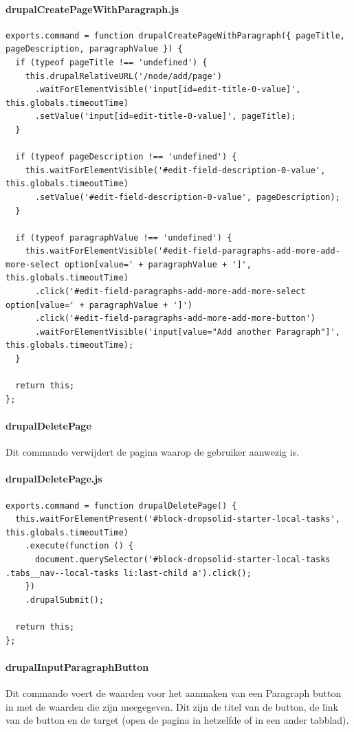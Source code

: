 \paragraph{drupalCreatePageWithParagraph.js}
\begin{lstlisting}[breaklines=true]
exports.command = function drupalCreatePageWithParagraph({ pageTitle, pageDescription, paragraphValue }) {
  if (typeof pageTitle !== 'undefined') {
    this.drupalRelativeURL('/node/add/page')
      .waitForElementVisible('input[id=edit-title-0-value]', this.globals.timeoutTime)
      .setValue('input[id=edit-title-0-value]', pageTitle);
  }

  if (typeof pageDescription !== 'undefined') {
    this.waitForElementVisible('#edit-field-description-0-value', this.globals.timeoutTime)
      .setValue('#edit-field-description-0-value', pageDescription);
  }

  if (typeof paragraphValue !== 'undefined') {
    this.waitForElementVisible('#edit-field-paragraphs-add-more-add-more-select option[value=' + paragraphValue + ']', this.globals.timeoutTime)
      .click('#edit-field-paragraphs-add-more-add-more-select option[value=' + paragraphValue + ']')
      .click('#edit-field-paragraphs-add-more-add-more-button')
      .waitForElementVisible('input[value="Add another Paragraph"]', this.globals.timeoutTime);
  }

  return this;
};
\end{lstlisting}


\clearpage
\paragraph{drupalDeletePage}
\label{commando14}
Dit commando verwijdert de pagina waarop de gebruiker aanwezig is.
\paragraph{drupalDeletePage.js}
\begin{lstlisting}[breaklines=true]
exports.command = function drupalDeletePage() {
  this.waitForElementPresent('#block-dropsolid-starter-local-tasks', this.globals.timeoutTime)
    .execute(function () {
      document.querySelector('#block-dropsolid-starter-local-tasks .tabs__nav--local-tasks li:last-child a').click();
    })
    .drupalSubmit();

  return this;
};
\end{lstlisting}


\clearpage
\paragraph{drupalInputParagraphButton}
\label{commando15}
Dit commando voert de waarden voor het aanmaken van een Paragraph button in met de waarden die zijn meegegeven. Dit zijn de titel van de button, de link van de button en de target (open de pagina in hetzelfde of in een ander tabblad).
